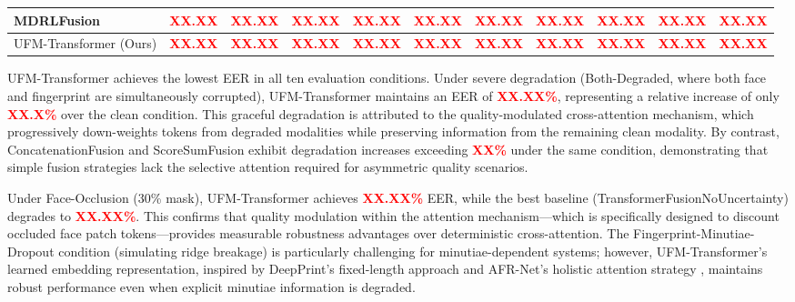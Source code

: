 \documentclass[10pt,journal,compsoc]{IEEEtran}
\begin{document}
\begin{table}[htbp]
\begin{tabular}{l | c | c c c c c | c c c}
MDRLFusion & \textcolor{red}{\textbf{XX.XX}} & \textcolor{red}{\textbf{XX.XX}} & \textcolor{red}{\textbf{XX.XX}} & \textcolor{red}{\textbf{XX.XX}} & \textcolor{red}{\textbf{XX.XX}} & \textcolor{red}{\textbf{XX.XX}} & \textcolor{red}{\textbf{XX.XX}} & \textcolor{red}{\textbf{XX.XX}} & \textcolor{red}{\textbf{XX.XX}} & \textcolor{red}{\textbf{XX.XX}} \\ %
\hline
UFM-Transformer (Ours) & \textcolor{red}{\textbf{XX.XX}} & \textcolor{red}{\textbf{XX.XX}} & \textcolor{red}{\textbf{XX.XX}} & \textcolor{red}{\textbf{XX.XX}} & \textcolor{red}{\textbf{XX.XX}} & \textcolor{red}{\textbf{XX.XX}} & \textcolor{red}{\textbf{XX.XX}} & \textcolor{red}{\textbf{XX.XX}} & \textcolor{red}{\textbf{XX.XX}} & \textcolor{red}{\textbf{XX.XX}} \\ %
\hline
\end{tabular}
\end{table}

UFM-Transformer achieves the lowest EER in all ten evaluation conditions. Under severe degradation (Both-Degraded, where both face and fingerprint are simultaneously corrupted), UFM-Transformer maintains an EER of \textcolor{red}{\textbf{XX.XX\%}}, %
representing a relative increase of only \textcolor{red}{\textbf{XX.X\%}} over the clean condition. %
This graceful degradation is attributed to the quality-modulated cross-attention mechanism, which progressively down-weights tokens from degraded modalities while preserving information from the remaining clean modality. By contrast, ConcatenationFusion and ScoreSumFusion exhibit degradation increases exceeding \textcolor{red}{\textbf{XX\%}} under the same condition, %
demonstrating that simple fusion strategies lack the selective attention required for asymmetric quality scenarios.

Under Face-Occlusion (30\% mask), UFM-Transformer achieves \textcolor{red}{\textbf{XX.XX\%}} EER, %
while the best baseline (TransformerFusionNoUncertainty) degrades to \textcolor{red}{\textbf{XX.XX\%}}. %
This confirms that quality modulation within the attention mechanism---which is specifically designed to discount occluded face patch tokens---provides measurable robustness advantages over deterministic cross-attention. The Fingerprint-Minutiae-Dropout condition (simulating ridge breakage) is particularly challenging for minutiae-dependent systems; however, UFM-Transformer's learned embedding representation, inspired by DeepPrint's fixed-length approach \cite{engelsma2021deepprint} and AFR-Net's holistic attention strategy \cite{grosz2024afrnet}, maintains robust performance even when explicit minutiae information is degraded.
\end{document}
